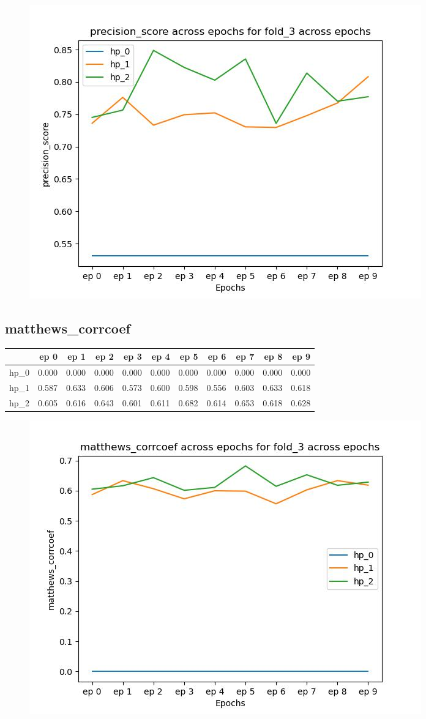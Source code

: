 \documentclass{article}
\begin{document}
\begin{figure}[H]
\includegraphics[scale = 0.75]{fold_3/precision_score}
\end{figure}
\subsection{matthews\_corrcoef}
\begin{tabular}{lrrrrrrrrrr}
\toprule
{} &   ep 0 &   ep 1 &   ep 2 &   ep 3 &   ep 4 &   ep 5 &   ep 6 &   ep 7 &   ep 8 &   ep 9 \\
\midrule
hp\_0 &  0.000 &  0.000 &  0.000 &  0.000 &  0.000 &  0.000 &  0.000 &  0.000 &  0.000 &  0.000 \\
hp\_1 &  0.587 &  0.633 &  0.606 &  0.573 &  0.600 &  0.598 &  0.556 &  0.603 &  0.633 &  0.618 \\
hp\_2 &  0.605 &  0.616 &  0.643 &  0.601 &  0.611 &  0.682 &  0.614 &  0.653 &  0.618 &  0.628 \\
\bottomrule
\end{tabular}

\begin{figure}[H]
\includegraphics[scale = 0.75]{fold_3/matthews_corrcoef}
\end{figure}
\end{document}
